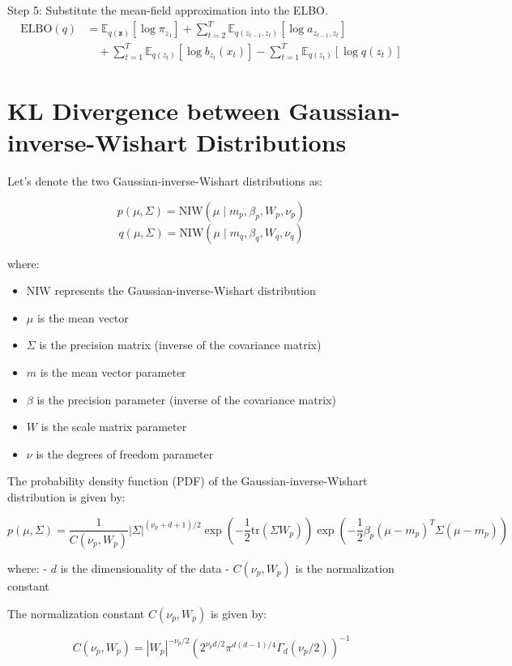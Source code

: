 \documentclass[11pt]{article}
\begin{document}
    Step 5: Substitute the mean-field approximation into the ELBO.
    \begin{align}
        \text{ELBO}(q) &= \mathbb{E}_{q(\mathbf{z})}[\log \pi_{z_1}] + \sum_{t=2}^T \mathbb{E}_{q(z_{t-1}, z_t)}[\log a_{z_{t-1}, z_t}] \\
        &\quad + \sum_{t=1}^T \mathbb{E}_{q(z_t)}[\log b_{z_t}(x_t)] - \sum_{t=1}^T \mathbb{E}_{q(z_t)}[\log q(z_t)]
    \end{align}


    \section{KL Divergence between Gaussian-inverse-Wishart Distributions}
    Let's denote the two Gaussian-inverse-Wishart distributions as:

    $$p(\mu, \Sigma) = \text{NIW}(\mu \mid m_p, \beta_p, W_p, \nu_p)$$
    $$q(\mu, \Sigma) = \text{NIW}(\mu \mid m_q, \beta_q, W_q, \nu_q)$$

    where:
    \begin{itemize}
        \item NIW represents the Gaussian-inverse-Wishart distribution
        \item $\mu$ is the mean vector
        \item $\Sigma$ is the precision matrix (inverse of the covariance matrix)
        \item $m$ is the mean vector parameter
        \item $\beta$ is the precision parameter (inverse of the covariance matrix)
        \item $W$ is the scale matrix parameter
        \item $\nu$ is the degrees of freedom parameter
    \end{itemize}


    The probability density function (PDF) of the Gaussian-inverse-Wishart distribution is given by:

    $$p(\mu, \Sigma) = \frac{1}{C(\nu_p, W_p)} |\Sigma|^{(\nu_p+d+1)/2} \exp\left(-\frac{1}{2} \text{tr}(\Sigma W_p)\right) \exp\left(-\frac{1}{2} \beta_p (\mu-m_p)^T \Sigma (\mu-m_p)\right)$$

    where:
    - $d$ is the dimensionality of the data
    - $C(\nu_p, W_p)$ is the normalization constant

    The normalization constant $C(\nu_p, W_p)$ is given by:

    $$C(\nu_p, W_p) = |W_p|^{-\nu_p/2} \left(2^{\nu_p d/2} \pi^{d(d-1)/4} \Gamma_d(\nu_p/2)\right)^{-1}$$
\end{document}
